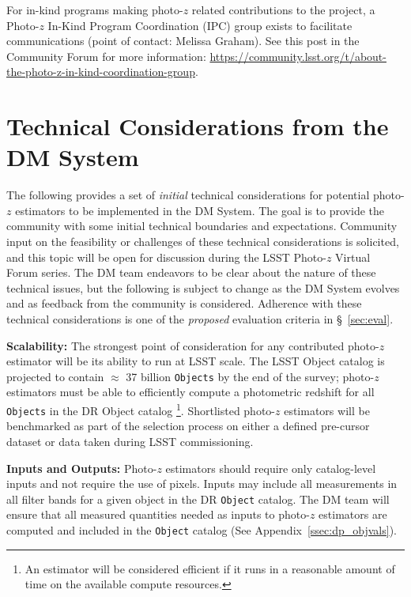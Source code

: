 \documentclass[DM,lsstdraft,toc]{lsstdoc}
\begin{document}
For in-kind programs making photo-$z$ related contributions to the project, a Photo-$z$ In-Kind Program Coordination (IPC) group exists to facilitate communications (point of contact: Melissa Graham). See this post in the Community Forum for more information: \url{https://community.lsst.org/t/about-the-photo-z-in-kind-coordination-group}.


\clearpage
\section{Technical Considerations from the DM System}\label{sec:dmcon}
The following provides a set of {\it initial} technical considerations for potential photo-$z$ estimators to be implemented in the DM System.
The goal is to provide the community with some initial technical boundaries and expectations. 
Community input on the feasibility or challenges of these technical considerations is solicited, and this topic will be open for discussion during the LSST Photo-$z$ Virtual Forum series.
The DM team endeavors to be clear about the nature of these technical issues, but the following is subject to change as the DM System evolves and as feedback from the community is considered. 
Adherence with these technical considerations is one of the {\it proposed} evaluation criteria in \S~\ref{sec:eval}.

\textbf{Scalability:}
The strongest point of consideration for any contributed  photo-$z$ estimator will be its ability to run at LSST scale. 
The LSST Object catalog is projected to contain $\approx$ 37 billion {\tt Objects} by the end of the survey;  photo-$z$ estimators must be able to efficiently compute a photometric redshift for all {\tt Objects} in the DR Object catalog \footnote{An estimator will be considered efficient if it runs in a reasonable amount of time on the available compute resources. }. 
Shortlisted photo-$z$ estimators will be benchmarked as part of the selection process on either a defined pre-cursor dataset or data taken during LSST commissioning. 

\textbf{Inputs and Outputs:}
Photo-$z$ estimators should require only catalog-level inputs and not require the use of pixels. 
Inputs may include all measurements in all filter bands for a given object in the DR {\tt Object} catalog. 
The DM team will ensure that all measured quantities needed as inputs to photo-$z$ estimators are computed and included in the {\tt Object} catalog (See Appendix~\ref{ssec:dp_objvals}). 
\end{document}
